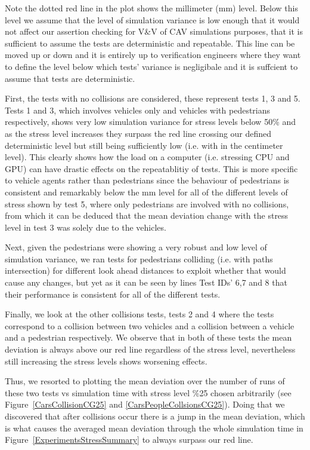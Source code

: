 Note the dotted red line in the plot shows the millimeter (mm) level. 
Below this level we assume that the level of simulation variance is low enough that it would not affect our assertion checking for V\&V of CAV simulations purposes, that it is sufficient to assume the tests are deterministic and repeatable. 
This line can be moved up or down and it is entirely up to verification engineers where they want to define the level below which tests' variance is negligibale and it is suffcient to assume that tests are deterministic.


First, the tests with no collisions are considered, these represent tests 1, 3 and 5.
Tests 1 and 3, which involves vehicles only and vehicles with pedestrians respectively, shows very low simulation variance for stress levels below 50\% and as the stress level increases they surpass the red line crossing our defined deterministic level but still being sufficiently low (i.e. with in the centimeter level). This clearly shows how the load on a computer (i.e. stressing CPU and GPU) can have drastic effects on the repeatablitiy of tests.
This is more specific to vehicle agents rather than pedestrians since the behaviour of pedestrians is consistent and remarkably below the mm level for all of the different levels of stress shown by test 5, where only pedestrians are involved with no collisions, from which it can be deduced that the mean deviation change with the stress level in test 3 was solely due to the vehicles.

Next, given the pedestrians were showing a very robust and low level of simulation variance, we ran tests for pedestrians colliding (i.e. with paths intersection) for different look ahead distances to exploit whether that would cause any changes, but yet as it can be seen by lines Test IDs' 6,7 and 8 that their performance is consistent for all of the different tests.

Finally, we look at the other collisions tests, tests 2 and 4 where the tests correspond to a collision between two vehicles and a collision between a vehicle and a pedestrian respectively. 
We observe that in both of these tests the mean deviation is always above our red line regardless of the stress level, nevertheless still increasing the stress levels shows worsening effects.

Thus, we resorted to plotting the mean deviation over the number of runs of these two tests vs simulation time with stress level \%25 chosen arbitrarily (see Figure~\ref{CarsCollisionCG25} and \ref{CarsPeopleCollsionsCG25}). 
Doing that we discovered that after collisions occur there is a jump in the mean deviation, which is what causes the averaged mean deviation through the whole simulation time in Figure~\ref{ExperimentsStressSummary} to always surpass our red line.

